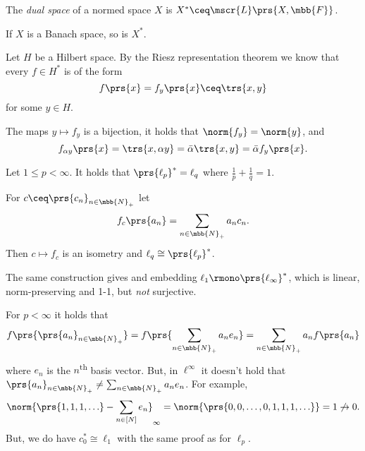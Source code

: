 \documentclass[10pt, twoside]{book}
\begin{document}
\begin{definition}
The \emph{dual space} of a normed space $X$ is $X^* \ceq \mscr{L}\prs{X,\mbb{F}}$.
\end{definition}

\begin{remark}
If $X$ is a Banach space, so is $X^*$.
\end{remark}

\begin{example}
Let $H$ be a Hilbert space. By the Riesz representation theorem we know that every $f \in H^*$ is of the form
\[f\prs{x} = f_y\prs{x} \ceq \trs{x,y}\]
for some $y \in H$.

The maps $y \mapsto f_y$ is a bijection, it holds that $\norm{f_y} = \norm{y}$, and
\[f_{\alpha y}\prs{x} = \trs{x, \alpha y} = \bar{\alpha} \trs{x,y} = \bar{\alpha} f_y\prs{x} \text{.}\]
\end{example}

\begin{example}
Let $1 \leq p < \infty$. It holds that $\prs{\ell_p}^* = \ell_q$ where $\frac{1}{p} + \frac{1}{q} = 1$.

For $c \ceq \prs{c_n}_{n \in \mbb{N}_+}$ let \[f_c\prs{a_n} = \sum_{n \in \mbb{N}_+} a_n c_n \text{.}\] Then $c \mapsto f_c$ is an isometry and $\ell_q \cong \prs{\ell_p}^*$.
\end{example}

\begin{example}
The same construction gives and embedding $\ell_1 \rmono \prs{\ell_\infty}^*$, which is linear, norm-preserving and 1-1, but \emph{not} surjective.

For $p < \infty$ it holds that
\[f\prs{\prs{a_n}_{n \in \mbb{N}_+}} = f\prs{\sum_{n \in \mbb{N}_+} a_n e_n} = \sum_{n \in \mbb{N}_+} a_n f\prs{a_n}\]
where $e_n$ is the $n$\textsuperscript{th} basis vector.
But, in $\ell^\infty$ it doesn't hold that $\prs{a_n}_{n \in \mbb{N}_+} \neq \sum_{n \in \mbb{N}_+} a_n e_n$.
For example,
\[\norm{\prs{1,1,1, \ldots} - \sum_{n \in [N]} e_n}_{\infty} = \norm{\prs{0,0,\ldots, 0, 1, 1, 1, \ldots}} = 1 \not\rightarrow 0 \text{.}\]
But, we do have $c_0^* \cong \ell_1$ with the same proof as for $\ell_p$.
\end{example}
\end{document}
